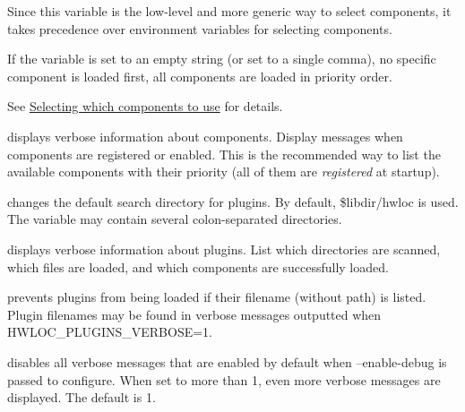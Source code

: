\begin{DoxyDescription}
Since this variable is the low-\/level and more generic way to select components, it takes precedence over environment variables for selecting components.

If the variable is set to an empty string (or set to a single comma), no specific component is loaded first, all components are loaded in priority order.

See \hyperlink{a00392_plugins_select}{Selecting which components to use} for details. 


\item[H\+W\+L\+O\+C\+\_\+\+C\+O\+M\+P\+O\+N\+E\+N\+T\+S\+\_\+\+V\+E\+R\+B\+O\+SE=1 ]displays verbose information about components. Display messages when components are registered or enabled. This is the recommended way to list the available components with their priority (all of them are {\itshape registered} at startup). 


\item[H\+W\+L\+O\+C\+\_\+\+P\+L\+U\+G\+I\+N\+S\+\_\+\+P\+A\+TH=/path/to/hwloc/plugins/\+:... ]changes the default search directory for plugins. By default, {\ttfamily \$libdir/hwloc} is used. The variable may contain several colon-\/separated directories. 


\item[H\+W\+L\+O\+C\+\_\+\+P\+L\+U\+G\+I\+N\+S\+\_\+\+V\+E\+R\+B\+O\+SE=1 ]displays verbose information about plugins. List which directories are scanned, which files are loaded, and which components are successfully loaded. 


\item[H\+W\+L\+O\+C\+\_\+\+P\+L\+U\+G\+I\+N\+S\+\_\+\+B\+L\+A\+C\+K\+L\+I\+ST=filename1,filename2,... ]prevents plugins from being loaded if their filename (without path) is listed. Plugin filenames may be found in verbose messages outputted when H\+W\+L\+O\+C\+\_\+\+P\+L\+U\+G\+I\+N\+S\+\_\+\+V\+E\+R\+B\+O\+SE=1. 


\item[H\+W\+L\+O\+C\+\_\+\+D\+E\+B\+U\+G\+\_\+\+V\+E\+R\+B\+O\+SE=0 ]disables all verbose messages that are enabled by default when {\ttfamily --enable-\/debug} is passed to configure. When set to more than 1, even more verbose messages are displayed. The default is 1. 


\end{DoxyDescription}